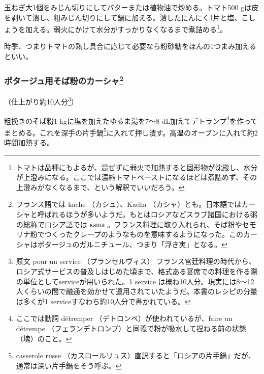 \begin{recette}
玉ねぎ大1個をみじん切りにしてバターまたは植物油で炒める。トマト500
gは皮を剥いて潰し、粗みじん切りにして鍋に加える。潰したにんにく1片と塩、こしょうを加える。弱火にかけて水分がすっかりなくなるまで煮詰める\footnote{トマトは品種にもよるが、混ぜずに弱火で加熱すると固形物が沈殿し、水分が上澄みになる。ここでは濃縮トマトペーストになるほどは煮詰めず、その上澄みがなくなるまで、という解釈でいいだろう。}。

時季、つまりトマトの熟し具合に応じて必要なら粉砂糖をほんの1つまみ加えるといい。

\atoaki{}

\hypertarget{kache-de-sarrazin-pour-potage}{%
\subsubsection[ポタージュ用そば粉のカーシャ]{\texorpdfstring{ポタージュ用そば粉のカーシャ\footnote{フランス語では
  kache （カシュ）、Kacha
  （カシャ）とも。日本語ではカーシャと呼ばれるほうが多いようだ。もとはロシアなどスラブ諸国における粥の総称でロシア語では
  каша
  。フランス料理に取り入れられ、そば粉やセモリナ粉でつくったクレープのようなものを意味するようになった。このカーシャはポタージュのガルニチュール、つまり「浮き実」となる。}}{ポタージュ用そば粉のカーシャ}}\label{kache-de-sarrazin-pour-potage}}



（仕上がり約10人分\footnote{原文 pour un service （プランセルヴィス）
  フランス宮廷料理の時代から、ロシア式サービスの普及しはじめた頃まで、格式ある宴席での料理を作る際の単位としてserviceが用いられた。1
  service
  は概ね10人分。現実には8〜12人くらいの間で融通を効かせて運用されていたようだ。本書のレシピの分量は多くが1
  serviceすなわち約10人分で書かれている。}）

粗挽きのそば粉1 kgに塩を加えたゆるま湯を7〜8
dL加えてデトランプ\footnote{ここでは動詞 détremper
  （デトロンペ）が使われているが、faire un détrempe
  （フェランデトロンプ）と同義で粉が吸水して捏ねる前の状態（塊）のこと。}を作ってまとめる。これを深手の片手鍋\footnote{casserole
  russe
  （カスロールリュス）直訳すると「ロシアの片手鍋」だが、通常は深い片手鍋をそう呼ぶ。}に入れて押し潰す。高温のオーブンに入れて約2時間加熱する。


\end{recette}

